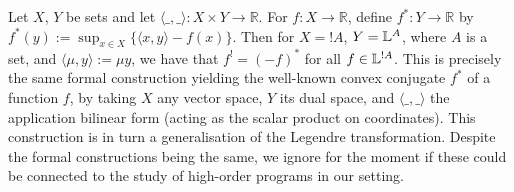 \begin{remark}
 Let $X$, $Y$ be sets and let $\langle \_,\_\rangle:X\times Y \to \mathbb{R}$.
 For $f:X\to \mathbb R$, define $f^*:Y\to \mathbb R$ by $f^*(y):= \sup_{x\in X}\{\langle x,y\rangle - f(x)\}$.
 Then for $X=!A$, $Y=\mathbb{L}^A$, where $A$ is a set, and $\langle \mu, y \rangle:= \mu y$, we have that $f^!=(-f)^*$ for all $f\in\mathbb{L}^{!A}$.
 This is precisely the same formal construction yielding the well-known convex conjugate $f^*$ of a function $f$, by taking $X$ any vector space, $Y$ its dual space, and $\langle \_,\_\rangle$ the application bilinear form (acting as the scalar product on coordinates).
 This construction is in turn a generalisation of the Legendre transformation.
 Despite the formal constructions being the same, we ignore for the moment if these could be connected to the study of high-order programs in our setting.
\end{remark}
